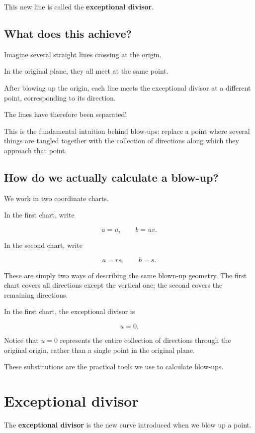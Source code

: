 \documentclass[12pt]{article}
\begin{document}
This new line is called the \textbf{exceptional divisor}.

\subsection{What does this achieve?}\label{what-does-this-achieve}

Imagine several straight lines crossing at the origin.

In the original plane, they all meet at the same point.

After blowing up the origin, each line meets the exceptional divisor at
a different point, corresponding to its direction.

The lines have therefore been separated!

This is the fundamental intuition behind blow-ups: replace a point where
several things are tangled together with the collection of directions
along which they approach that point.

\subsection{How do we actually calculate a
blow-up?}\label{how-do-we-actually-calculate-a-blow-up}

We work in two coordinate charts.

In the first chart, write

\[
a=u,\qquad b=uv.
\]

In the second chart, write

\[
a=rs,\qquad b=s.
\]

These are simply two ways of describing the same blown-up geometry. The
first chart covers all directions except the vertical one; the second
covers the remaining directions.

In the first chart, the exceptional divisor is

\[
u=0.
\]

Notice that \(u=0\) represents the entire collection of directions
through the original origin, rather than a single point in the original
plane.

These substitutions are the practical tools we use to calculate
blow-ups.

\newpage
\section{Exceptional divisor}\label{exceptional-divisor}

The \textbf{exceptional divisor} is the new curve introduced when we
blow up a point.
\end{document}
